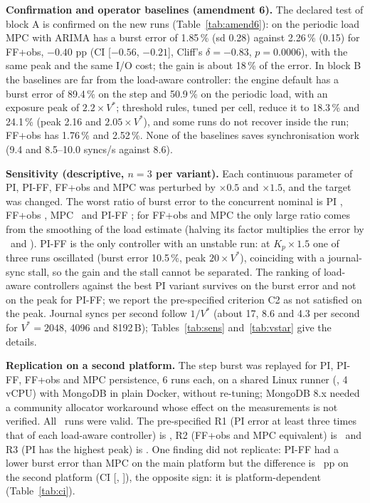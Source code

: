 \documentclass[journal]{IEEEtran}
\begin{document}
\textbf{Confirmation and operator baselines (amendment 6).} The declared test of block A is confirmed on the new runs (Table~\ref{tab:amend6}): on the periodic load MPC with ARIMA has a burst error of 1.85\,\% (sd 0.28) against 2.26\,\% (0.15) for FF+obs, $-0.40$ pp (CI [$-0.56$, $-0.21$], Cliff's $\delta=-0.83$, $p=0.0006$), with the same peak and the same I/O cost; the gain is about 18\,\% of the error. In block B the baselines are far from the load-aware controller: the engine default has a burst error of 89.4\,\% on the step and 50.9\,\% on the periodic load, with an exposure peak of $2.2\times V^*$; threshold rules, tuned per cell, reduce it to 18.3\,\% and 24.1\,\% (peak 2.16 and $2.05\times V^*$), and some runs do not recover inside the run; FF+obs has 1.76\,\% and 2.52\,\%. None of the baselines saves synchronisation work (9.4 and 8.5--10.0 syncs/s against 8.6).


\textbf{Sensitivity (descriptive, $n=3$ per variant).} Each continuous parameter of PI, PI-FF, FF+obs and MPC was perturbed by $\times0.5$ and $\times1.5$, and the target was changed. The worst ratio of burst error to the concurrent nominal is PI \SensWorstPIT, FF+obs \SensWorstFFO, MPC \SensWorstMPCP\ and PI-FF \SensWorstPIFF; for FF+obs and MPC the only large ratio comes from the smoothing of the load estimate (halving its factor multiplies the error by \SensSmoothFFO\ and \SensSmoothMPCP). PI-FF is the only controller with an unstable run: at $K_p\times1.5$ one of three runs oscillated (burst error 10.5\,\%, peak $20\times V^*$), coinciding with a journal-sync stall, so the gain and the stall cannot be separated. The ranking of load-aware controllers against the best PI variant survives on the burst error and not on the peak for PI-FF; we report the pre-specified criterion C2 as not satisfied on the peak. Journal syncs per second follow $1/V^*$ (about 17, 8.6 and 4.3 per second for $V^*=2048$, 4096 and 8192\,B); Tables~\ref{tab:sens} and~\ref{tab:vstar} give the details.



\textbf{Replication on a second platform.} The step burst was replayed for PI, PI-FF, FF+obs and MPC persistence, 6 runs each, on a shared Linux runner (\CICpu, 4 vCPU) with MongoDB in plain Docker, without re-tuning; MongoDB 8.x needed a community allocator workaround whose effect on the measurements is not verified. All \CIN\ runs were valid. The pre-specified R1 (PI error at least three times that of each load-aware controller) is \CIRone, R2 (FF+obs and MPC equivalent) is \CIRtwo\ and R3 (PI has the highest peak) is \CIRthree. One finding did not replicate: PI-FF had a lower burst error than MPC on the main platform but the difference is \CIPIFFvsMPCD\ pp on the second platform (CI [\CIPIFFvsMPCLo, \CIPIFFvsMPCHi]), the opposite sign: it is platform-dependent (Table~\ref{tab:ci}).

\end{document}
